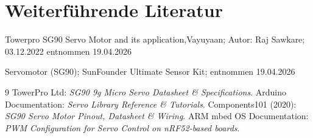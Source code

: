 \section{Weiterführende Literatur}
    Towerpro SG90 Servo Motor and its application,Vayuyaan; Autor: Raj Sawkare; 03.12.2022 entnommen 19.04.2026
    
    Servomotor (SG90); SunFounder Ultimate Sensor Kit; entnommen 19.04.2026
\begin{thebibliography}{9}
	 TowerPro Ltd: \textit{SG90 9g Micro Servo Datasheet \& Specifications}.
	 Arduino Documentation: \textit{Servo Library Reference \& Tutorials}.
	 Components101 (2020): \textit{SG90 Servo Motor Pinout, Datasheet \& Wiring}.
	 ARM mbed OS Documentation: \textit{PWM Configuration for Servo Control on nRF52-based boards}.
\end{thebibliography}